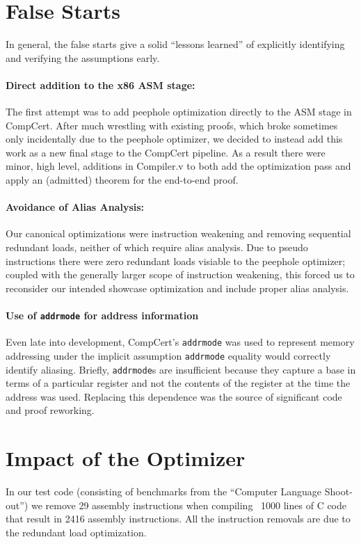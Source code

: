\documentclass{article}
\begin{document}
\section{False Starts}
In general, the false starts give a solid ``lessons learned'' of
explicitly identifying and verifying the assumptions early.


\paragraph{Direct addition to the x86 ASM stage: }
The first attempt was to add peephole optimization directly to the ASM
stage in CompCert.  After much wrestling with existing proofs, which
broke sometimes only incidentally due to the peephole optimizer, we
decided to instead add this work as a new final stage to the CompCert
pipeline.  As a result there were minor, high level, additions in
Compiler.v to both add the optimization pass and apply an (admitted)
theorem for the end-to-end proof.

\paragraph{Avoidance of Alias Analysis: }
Our canonical optimizations were instruction weakening and removing
sequential redundant loads, neither of which require alias analysis.
Due to pseudo instructions there were zero redundant loads visiable to
the peephole optimizer; coupled with the generally larger scope of
instruction weakening, this forced us to reconsider our intended
showcase optimization and include proper alias analysis.

\paragraph{Use of {\tt addrmode} for address information}
Even late into development, CompCert's {\tt addrmode} was used to represent
memory addressing under the implicit assumption {\tt addrmode} equality would 
correctly identify aliasing.  Briefly, {\tt addrmode}s are
insufficient because they capture a base in terms of a particular register
and not the contents of the register at the time the address was used.
Replacing this dependence was the source of significant code and proof
reworking.


\section{Impact of the Optimizer}
In our test code (consisting of benchmarks from the ``Computer
Language Shoot-out'') we remove 29 assembly instructions when
compiling ~1000 lines of C code that result in 2416 assembly
instructions.  All the instruction removals are due to the redundant
load optimization. 
\end{document}

